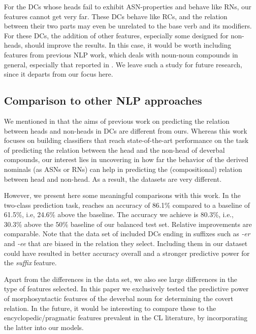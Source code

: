\documentclass[output=paper]{langsci/langscibook}
\begin{document}
For the DCs whose heads fail to exhibit ASN-properties and behave like RNs, our features cannot get very far.  {These DCs behave like RCs, and the relation between their two parts may even be unrelated to the base verb and its modifiers.} For these DCs, the addition of other features, especially some designed for non-heads, should improve the results. In this case, it would be worth including features from previous NLP work, which deals with noun-noun compounds in general, especially that reported in . 
 {We leave such a study for future research, since it departs from our focus here.}


\subsection{Comparison to other NLP approaches}\label{sec:discussion-comparison}

We mentioned in  that the aims of previous work on predicting the relation between heads and non-heads in DCs are  different from ours. Whereas this work focuses on building classifiers that reach state-of-the-art performance on the task of predicting the relation between the head and the non-head of deverbal compounds, our interest lies in uncovering in how far the behavior of the derived nominals (as ASNs or RNs) can help in predicting the (compositional) relation between head and non-head. As a result, the datasets are very different. 

However, we present here some meaningful comparisons with  this work. In the two-class prediction task, \cite{lapata:02} reaches an accuracy of 86.1\% compared to a baseline of 61.5\%, i.e, 24.6\% above the baseline. The accuracy we achieve is 80.3\%, i.e., 30.3\% above the 50\% baseline of our balanced test set. Relative improvements are comparable. Note that the data set of \cite{lapata:02} included DCs ending in suffixes such as \textit{-er} and  \textit{-ee} that are  biased in the relation they select. Including them in our dataset could have resulted in better accuracy overall and a stronger predictive power for the \textit{suffix} feature. 

Apart from the differences in the data set, we also see large differences in the type of features selected. In this paper we exclusively 
tested the predictive power of morphosyntactic features of the deverbal noun for determining the covert relation. In the future, it would be interesting to compare these to the encyclopedic/pragmatic features prevalent in the CL literature, by incorporating the latter into our models.
\end{document}
